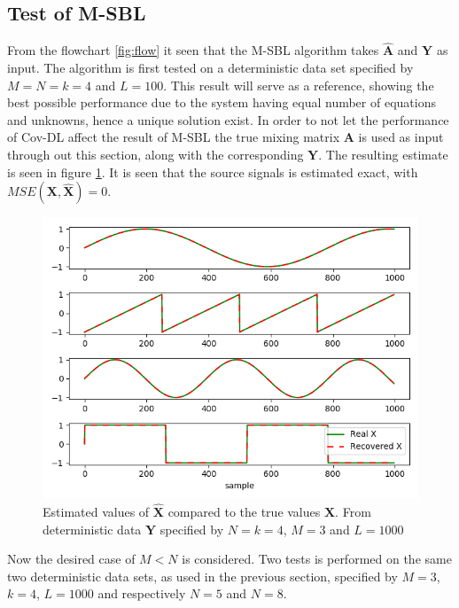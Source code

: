 \subsection{Test of M-SBL}
From the flowchart \ref{fig:flow} it seen that the M-SBL algorithm takes $\hat{\mathbf{A}}$ and $\mathbf{Y}$ as input.
The algorithm is first tested on a deterministic data set specified by $M=N=k=4$ and $L=100$. This result will serve as a reference, showing the best possible performance due to the system having equal number of equations and unknowns, hence a unique solution exist.
In order to not let the performance of Cov-DL affect the result of M-SBL the true mixing matrix $\mathbf{A}$ is used as input through out this section, along with the corresponding $\mathbf{Y}$. 
The resulting estimate is seen in figure \ref{fig:M-SBL_simple0}. It is seen that the source signals is estimated exact, with $MSE(\textbf{X},\hat{\textbf{X}})= 0$. 
\begin{figure}[H]
\centering
\includegraphics[scale=0.5]{figures/ch_6/M-SBL_simple0.png}
\caption{Estimated values of $\hat{\textbf{X}}$ compared to the true values $\textbf{X}$. From deterministic data $\textbf{Y}$ specified by $N=k=4$, $M = 3$ and $L=1000$}
\label{fig:M-SBL_simple0}
\end{figure}

Now the desired case of $M<N$ is considered. Two tests is performed on the same two deterministic data sets, as used in the previous section, specified by $M = 3$, $k = 4$, $L=1000$ and respectively $N = 5$ and $N = 8$.

